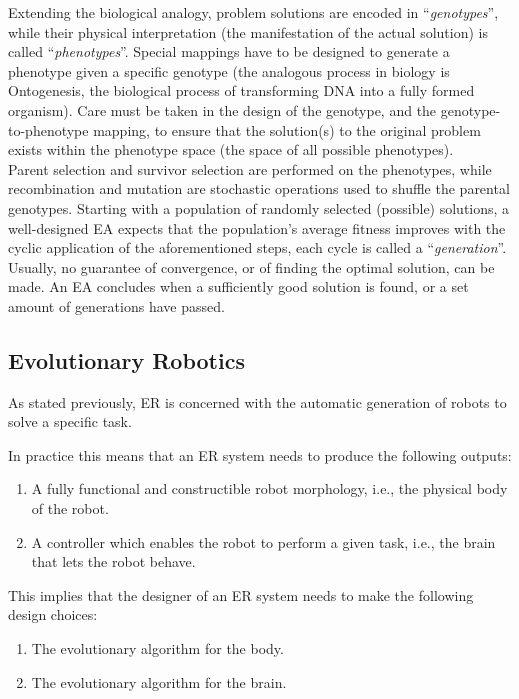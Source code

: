 \documentclass{scrartcl}
\begin{document}
Extending the biological analogy, problem solutions are encoded in ``\textit{genotypes}'', while their physical interpretation (the manifestation of the actual solution) is called ``\textit{phenotypes}''.
Special mappings have to be designed to generate a phenotype given a specific genotype (the analogous process in biology is Ontogenesis, the biological process of transforming DNA into a fully formed organism).
Care must be taken in the design of the genotype, and the genotype-to-phenotype mapping, to ensure that the solution(s) to the original problem exists within the phenotype space (the space of all possible phenotypes). \\

Parent selection and survivor selection are performed on the phenotypes, while recombination and mutation are stochastic operations used to shuffle the parental genotypes.
Starting with a population of randomly selected (possible) solutions, a well-designed EA expects that the population's average fitness improves with the cyclic application of the aforementioned steps, each cycle is called a ``\textit{generation}''. \\

Usually, no guarantee of convergence, or of finding the optimal solution, can be made. 
An EA concludes when a sufficiently good solution is found, or a set amount of generations have passed.

\subsection{Evolutionary Robotics}
As stated previously, ER is concerned with the automatic generation of robots to solve a specific task.


In practice this means that an ER system needs to produce the following outputs:

\begin{enumerate}
  \item A fully functional and constructible robot morphology, i.e., the physical body of the robot.
  \item A controller which enables the robot to perform a given task, i.e., the brain that lets the robot behave.
\end{enumerate}

This implies that the designer of an ER system needs to make the following design choices:

\begin{enumerate}
  \item The evolutionary algorithm for the body.
  \item The evolutionary algorithm for the brain.
\end{enumerate}
\end{document}
